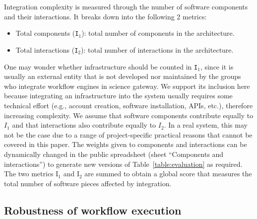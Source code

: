 \documentclass[preprint,3p,twocolumn]{elsarticle}
\newcommand{\correction}[1]{\color{blue}#1\color{black}\xspace}
\begin{document}
\correction{Integration complexity} is measured through the number of
software components and their interactions. It breaks down into the
following 2 metrics:
\begin{itemize}[leftmargin=0cm,itemindent=0.35cm,itemsep=0cm]
\item Total components (\texttt{I$_1$}): total number of components in
  the architecture.
\item Total interactions (\texttt{I$_2$}): total number of
  interactions in the architecture.
\end{itemize}
One may wonder whether infrastructure should be counted in
\texttt{I$_1$}, since it is usually an external entity that is not
developed nor maintained by the groups who integrate workflow engines
in science gateway. We support its inclusion here because integrating
an infrastructure into the system usually requires some technical
effort (e.g., account creation, software installation, APIs, etc.),
therefore increasing complexity. \correction{We assume that software
  components contribute equally to $I_1$ and that interactions also
  contribute equally to $I_2$. In a real system, this may not be the
  case due to a range of project-specific practical reasons that
  cannot be covered in this paper. The weights given to components and
  interactions can be dynamically changed in the public spreadsheet
  (sheet ``Components and interactions'') to generate new versions of
  Table~\ref{table:evaluation} as required.} The two metrics
\correction{I$_1$ and I$_2$} are summed to obtain a global score that
measures the total number of software pieces affected by integration.

\subsection{\correction{Robustness of workflow execution}}
\end{document}
